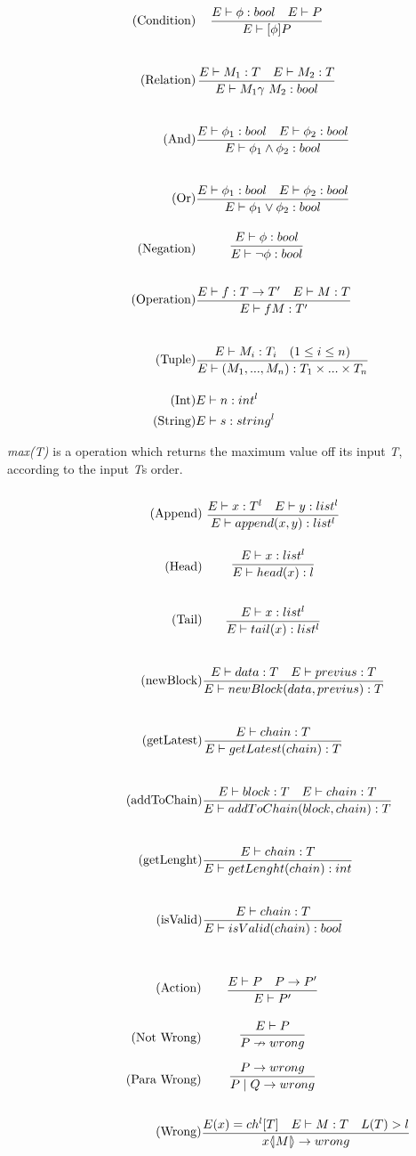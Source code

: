 \begin{align*}
\tag{Condition} &\infrule{E\vdash \phi:bool\quad E\vdash P}{E \vdash [\phi] P}\\
\tag{Relation} &\infrule{E\vdash M_1:T \quad E\vdash M_2:T}{E\vdash M_1 \gamma\ M_2:bool}\\
\tag{And} &\infrule{E\vdash \phi _1:bool \quad E\vdash \phi _2:bool}{E\vdash \phi _1 \land \phi _2:bool}\\
\tag{Or} &\infrule{E\vdash \phi _1:bool \quad E\vdash \phi _2:bool}{E\vdash \phi _1 \lor \phi _2:bool}\\
\tag{Negation} &\infrule{E\vdash \phi :bool }{E\vdash \neg \phi :bool}\\
\tag{Operation} &\infrule{E\vdash f:T\ra T'\quad E\vdash M:T}{E\vdash fM:T'}\\
\tag{Tuple} &\infrule{E\vdash M_i:T_i \quad (1\leq i\leq n)}{E\vdash (M_1,...,M_n):T_1\times...\times T_n}\\
\tag{Int} &E\vdash n: int^l\\
\tag{String} &E\vdash s:string^l\\
\end{align*}

\textit{max(T)} is a operation which returns the maximum value off its input \textit{T}, according to the input \textit{T}s order.
\begin{align*}
\tag{Append} &\infrule{E \vdash x:T^l \quad E \vdash y:list^l}{E \vdash append(x,y):list^l}\\
\tag{Head} &\infrule{E \vdash x:list^l}{E \vdash head(x):l}\\
\tag{Tail} &\infrule{E \vdash x:list^l}{E \vdash tail(x):list^l}\\
\tag{newBlock}& \infrule{E \vdash data:T \quad E \vdash previus : T}{E \vdash newBlock(data, previus) :T}\\
\tag{getLatest}& \infrule{E \vdash chain :T}{E \vdash getLatest(chain):T}\\
\tag{addToChain}& \infrule{E \vdash block:T \quad E \vdash chain:T}{E \vdash addToChain(block, chain):T}\\
\tag{getLenght}& \infrule{E \vdash chain:T}{E \vdash getLenght(chain):int}\\
\tag{isValid}& \infrule{E \vdash chain:T}{E \vdash isValid(chain):bool}
\end{align*}

\begin{align*}
\tag{Action} & \infrule{E \vdash P \quad P\ra P'}{E\vdash P'}\\
\tag{Not Wrong}& \infrule{E \vdash P}{P \nrightarrow wrong}\\
\tag{Para Wrong}& \infrule{P \ra wrong}{P\para Q \ra wrong}\\
\tag{Wrong}& \infrule{E(x) = ch^l[T] \quad E \vdash M:T \quad L(T) > l }{\lift{x}{M} \ra wrong}
\end{align*}


